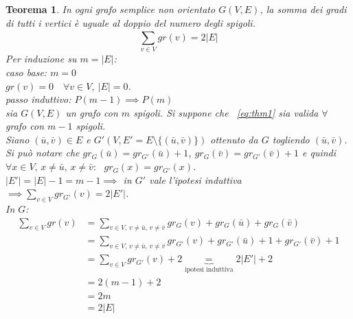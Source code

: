 \documentclass[a4paper, openany]{book}
\theoremstyle{plain}
\newtheorem{thm}{Teorema}[section]
\theoremstyle{definition}
\begin{document}
\begin{thm}
In ogni grafo semplice non orientato $G(V,E)$, la somma dei gradi di tutti i vertici è
uguale al doppio del numero degli spigoli.
\begin{equation} \label{eq:thm1} \sum_{v \in V}^{} gr(v) = 2|E| \end{equation}
\proof
	Per induzione su $m = |E|$:\\
	\emph{caso base: $m = 0$}\\	
	\indent $gr(v) = 0 \quad \forall v \in V$, \quad $|E| = 0$.\\
	\emph{passo induttivo:} $P(m-1) \implies P(m)$\\
	\indent sia $G(V,E)$ un grafo con $m$ spigoli. Si suppone che ~\ref{eq:thm1} 
	sia valida $\forall$ grafo con $m-1$ spigoli.\\
	Siano $(\bar{u}, \bar{v}) \in E$ e $G'(V, E'=E \setminus \{(\bar{u}, \bar{v})\})$ ottenuto da $G$ togliendo 
	$(\bar{u}, \bar{v})$.\\
	Si può notare che $gr_G(\bar{u})= gr_{G'}(\bar{u})+1$, $gr_G(\bar{v}) = gr_{G'}(\bar{v})+1$ e quindi
	${\forall x \in V \text{, } x \neq \bar{u} \text{, }  x \neq \bar{v}: \text{ } gr_G(x) = gr_{G'}(x)}$.\\%
	$|E'| = |E|-1 = m -1 \implies$ in $G'$ vale l'ipotesi induttiva 
    ${\implies \sum_{v \in V}^{} gr_{G'}(v) = 2|E'|}$.\\In $G$:
    \begin{equation*}%
    \begin{split}
	 \sum_{v \in V}^{} gr(v) & = 
     \sum_{v \in V \text{, } v \neq \bar{u} \text{, } v \neq \bar{v} }^{} 
        gr_G(v)+gr_G(\bar{u})+gr_G(\bar{v}) \\ & =
	 \sum_{v\in V\text{, }v\neq \bar{u}\text{, } v\neq \bar{v} }^{} 
        gr_{G'}(v)+gr_{G'}(\bar{u})+1 +gr_{G'}(\bar{v}) +1 \\ & =
	 \sum_{v \in V}^{} gr_{G'}(v) + 2 \underbrace{=}_{\text{ipotesi induttiva}} 2|E'| + 2 \\
     & = 2(m-1) + 2 \\
	 & = 2m \\ & = 2|E|
    \end{split}
    \end{equation*}
\endproof
\end{thm}
\end{document}
